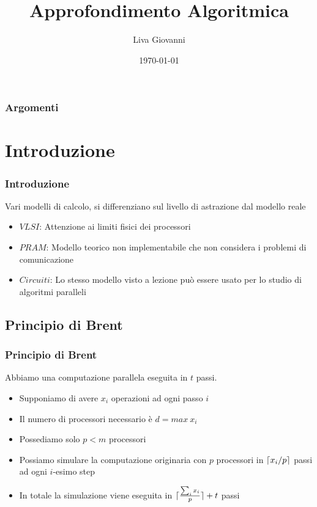 \documentclass{beamer}
\title[Parallel Computation]{Approfondimento Algoritmica} %
\author{Liva Giovanni} %
\institute[Udine] %
{
Università di Udine \\ %
\medskip
}
\date{\today} %
\DeclarePairedDelimiter{\ceil}{\lceil}{\rceil} %
\begin{document}
\begin{frame}
\titlepage %
\end{frame}

\begin{frame}
\frametitle{Argomenti} %
\tableofcontents %
\end{frame}

\section{Introduzione}

\begin{frame}
	\frametitle{Introduzione} %
	Vari modelli di calcolo, si differenziano sul livello di astrazione dal modello reale
	\begin{itemize}
		\item $VLSI$: Attenzione ai limiti fisici dei processori
		\item $PRAM$: Modello teorico non implementabile che non considera i problemi di comunicazione
		\item $Circuiti$: Lo stesso modello visto a lezione può essere usato per lo studio di algoritmi paralleli
	\end{itemize}
\end{frame}


\subsection{Principio di Brent}
\begin{frame}
	\frametitle{Principio di Brent} %
	Abbiamo una computazione parallela eseguita in $t$ passi.
	\begin{itemize}
		\item Supponiamo di avere $x_i$ operazioni ad ogni passo $i$
		\item Il numero di processori necessario è $d = max\ x_i$
		\item Possediamo solo $p<m$ processori
		\item Possiamo simulare la computazione originaria con $p$ processori in $\ceil{x_i / p}$ passi ad ogni $i$-esimo step
		\item In totale la simulazione viene eseguita in $\ceil{ \frac{\sum_i x_i}{p}    } + t$ passi
	\end{itemize}
\end{frame}
\end{document}
